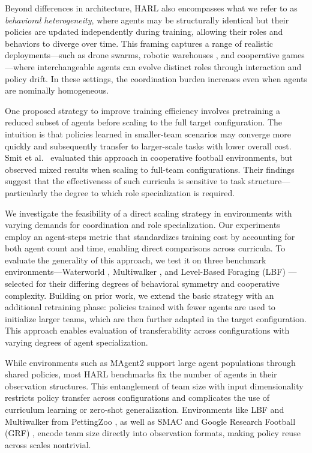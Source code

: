 \documentclass{article}
\begin{document}
Beyond differences in architecture, HARL also encompasses what we refer to as 
\emph{behavioral heterogeneity}, %
where agents may be structurally identical but their policies are updated independently 
during training, allowing their roles and behaviors to diverge over time.
This framing captures a range of realistic deployments—such as drone swarms, 
robotic warehouses \cite{rizk2019}, and cooperative games—where interchangeable agents 
can evolve distinct roles through interaction and policy drift. 
In these settings, the coordination burden increases even when agents are nominally homogeneous.

One proposed strategy to improve training efficiency involves pretraining a reduced subset of agents 
before scaling to the full target configuration. The intuition is that policies learned in smaller-team 
scenarios may converge more quickly and subsequently transfer to larger-scale tasks with lower 
overall cost. Smit et al.\ \cite{smit2023} evaluated this approach in cooperative football environments, 
but observed mixed results when scaling to full-team configurations. Their findings suggest that 
the effectiveness of such curricula is sensitive to task structure—particularly the degree to which 
role specialization is required.

We investigate the feasibility of a direct scaling strategy in environments with varying 
demands for coordination and role specialization. Our experiments employ an agent-steps 
metric that standardizes training cost by accounting for both agent count and time, 
enabling direct comparisons across curricula. To evaluate the generality of this approach, 
we test it on three benchmark environments—Waterworld \cite{gupta2017}, Multiwalker 
\cite{gupta2017}, and Level-Based Foraging (LBF) \cite{papoudakis2021}—selected for their 
differing degrees of behavioral symmetry and cooperative complexity. Building on prior work, 
we extend the basic strategy with an additional retraining phase: policies trained with 
fewer agents are used to initialize larger teams, which are then further adapted in the 
target configuration. This approach enables evaluation of transferability across 
configurations with varying degrees of agent specialization.

While environments such as MAgent2 \cite{zheng2017} support large agent populations through 
shared policies, most HARL benchmarks fix the number of agents in their observation structures. 
This entanglement of team size with input dimensionality restricts policy transfer across 
configurations and complicates the use of curriculum learning or zero-shot generalization. 
Environments like LBF and Multiwalker from PettingZoo \cite{terry2021}, as well as 
SMAC \cite{samvelyan2019} and Google Research Football (GRF) \cite{kurach2020}, 
encode team size directly into observation formats, making policy reuse across scales nontrivial.
\end{document}

